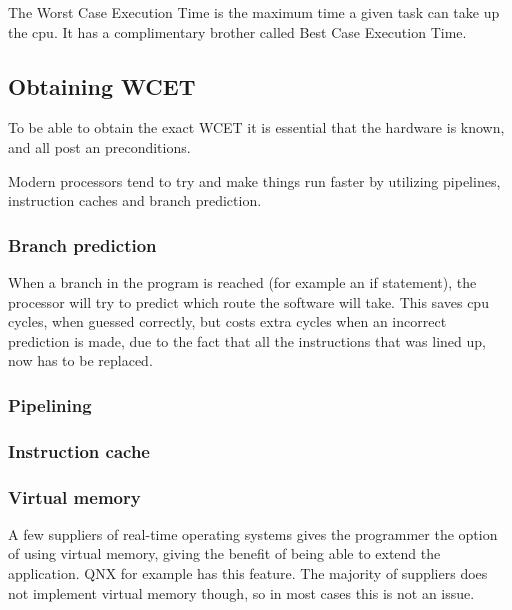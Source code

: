 The Worst Case Execution Time is the maximum time a given task can take up the cpu. It has a complimentary brother called Best Case Execution Time.


\subsection{Obtaining WCET}
To be able to obtain the exact WCET it is essential that the hardware is known, and all post an preconditions.

Modern processors tend to try and make things run faster by utilizing pipelines, instruction caches and branch prediction.

\subsubsection{Branch prediction}
When a branch in the program is reached (for example an if statement), the processor will try to predict which route the software will take. This saves cpu cycles, when guessed correctly, but costs extra cycles when an incorrect prediction is made, due to the fact that all the instructions that was lined up, now has to be replaced.

\subsubsection{Pipelining}

\subsubsection{Instruction cache}

\subsubsection{Virtual memory}
A few suppliers of real-time operating systems gives the programmer the option of using virtual memory, giving the benefit of being able to extend the application. QNX for example has this feature.
The majority of suppliers does not implement virtual memory though, so in most cases this is not an issue.